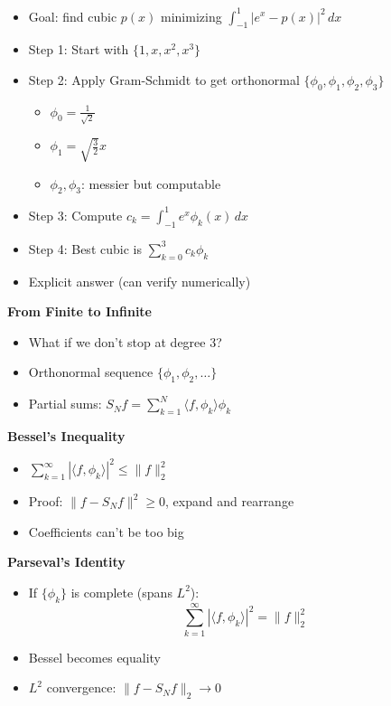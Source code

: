 \documentclass[
  10pt,
  letterpaper,
]{scrbook}
\providecommand{\tightlist}{%
  \setlength{\itemsep}{0pt}\setlength{\parskip}{0pt}}
\begin{document}
\begin{itemize}
\tightlist
\item
  Goal: find cubic \(p(x)\) minimizing
  \(\int_{-1}^1 |e^x - p(x)|^2\, dx\)
\item
  Step 1: Start with \(\{1, x, x^2, x^3\}\)
\item
  Step 2: Apply Gram-Schmidt to get orthonormal
  \(\{\phi_0, \phi_1, \phi_2, \phi_3\}\)

  \begin{itemize}
  \tightlist
  \item
    \(\phi_0 = \frac{1}{\sqrt{2}}\)
  \item
    \(\phi_1 = \sqrt{\frac{3}{2}} x\)
  \item
    \(\phi_2, \phi_3\): messier but computable
  \end{itemize}
\item
  Step 3: Compute \(c_k = \int_{-1}^1 e^x \phi_k(x)\, dx\)
\item
  Step 4: Best cubic is \(\sum_{k=0}^3 c_k \phi_k\)
\item
  Explicit answer (can verify numerically)
\end{itemize}

\textbf{From Finite to Infinite}

\begin{itemize}
\tightlist
\item
  What if we don't stop at degree 3?
\item
  Orthonormal sequence \(\{\phi_1, \phi_2, \ldots\}\)
\item
  Partial sums:
  \(S_N f = \sum_{k=1}^N \langle f, \phi_k \rangle \phi_k\)
\end{itemize}

\textbf{Bessel's Inequality}

\begin{itemize}
\tightlist
\item
  \(\sum_{k=1}^\infty |\langle f, \phi_k \rangle|^2 \leq \|f\|_2^2\)
\item
  Proof: \(\|f - S_N f\|^2 \geq 0\), expand and rearrange
\item
  Coefficients can't be too big
\end{itemize}

\textbf{Parseval's Identity}

\begin{itemize}
\tightlist
\item
  If \(\{\phi_k\}\) is complete (spans \(L^2\)):
  \[\sum_{k=1}^\infty |\langle f, \phi_k \rangle|^2 = \|f\|_2^2\]
\item
  Bessel becomes equality
\item
  \(L^2\) convergence: \(\|f - S_N f\|_2 \to 0\)
\end{itemize}
\end{document}
